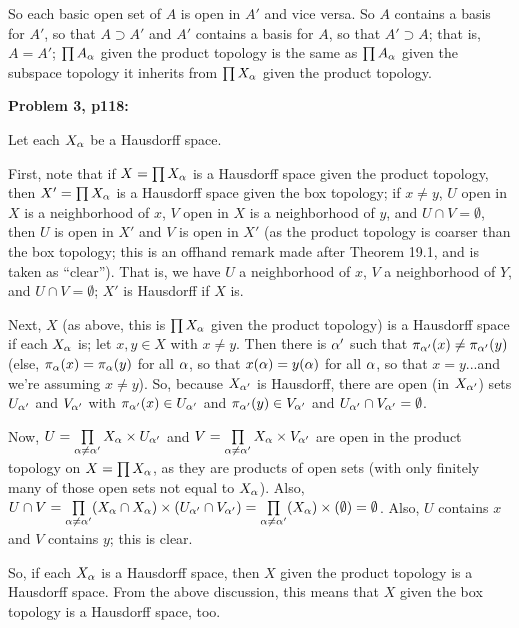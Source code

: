 \documentclass[a4paper,12pt]{article}
\begin{document}
So each basic open set of $A$ is open in $A'$ and vice versa. So $A$ contains a basis for $A'$, so that $A \supset A'$ and $A'$ contains a basis for $A$, so that $A' \supset A$; that is, $A = A'$; $\prod A_\alpha$ given the product topology is the same as $\prod A_\alpha$ given the subspace topology it inherits from $\prod X_\alpha$ given the product topology.

\shunt

{\bf Problem 3, p118:}

Let each $X_\alpha$ be a Hausdorff space.

First, note that if $X = \prod X_\alpha$ is a Hausdorff space given the product topology, then $X'=\prod X_\alpha$ is a Hausdorff space given the box topology; if $x \neq y$, $U$ open in $X$ is a neighborhood of $x$, $V$ open in $X$ is a neighborhood of $y$, and $U \cap V = \emptyset$, then $U$ is open in $X'$ and $V$ is open in $X'$ (as the product topology is coarser than the box topology; this is an offhand remark made after Theorem 19.1, and is taken as ``clear''). That is, we have $U$ a neighborhood of $x$, $V$ a neighborhood of $Y$, and $U \cap V = \emptyset$; $X'$ is Hausdorff if $X$ is.

Next, $X$ (as above, this is $\prod X_\alpha$ given the product topology) is a Hausdorff space if each $X_\alpha$ is; let $x,y \in X$ with $x \neq y$. Then there is $\alpha'$ such that $\pi_{\alpha'}(x) \neq \pi_{\alpha'}(y)$ (else, $\pi_{\alpha}(x) = \pi_{\alpha}(y)$ for all $\alpha$, so that $x(\alpha) = y(\alpha)$ for all $\alpha$, so that $x = y$...and we're assuming $x \neq y$). So, because $X_{\alpha'}$ is Hausdorff, there are open (in $X_{\alpha'}$) sets $U_{\alpha'}$ and $V_{\alpha'}$ with $\pi_{\alpha'}(x) \in U_{\alpha'}$ and $\pi_{\alpha'}(y) \in V_{\alpha'}$ and $U_{\alpha'} \cap V_{\alpha'} = \emptyset$.

Now, $U = \prod\limits_{\alpha \neq \alpha'} X_\alpha \times U_{\alpha'}$ and $V= \prod\limits_{\alpha \neq \alpha'} X_\alpha \times V_{\alpha'}$ are open in the product topology on $X = \prod X_\alpha$, as they are products of open sets (with only finitely many of those open sets not equal to $X_\alpha$). Also, $U \cap V = \prod\limits_{\alpha \neq \alpha'} (X_\alpha \cap X_\alpha) \times (U_{\alpha'} \cap V_{\alpha'}) = \prod\limits_{\alpha \neq \alpha'} (X_\alpha) \times (\emptyset) = \emptyset$. Also, $U$ contains $x$ and $V$ contains $y$; this is clear.

So, if each $X_\alpha$ is a Hausdorff space, then $X$ given the product topology is a Hausdorff space. From the above discussion, this means that $X$ given the box topology is a Hausdorff space, too.
\end{document}
